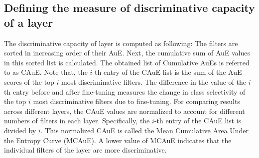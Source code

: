 \subsection{Defining the measure of discriminative capacity of a layer}
The discriminative capacity of layer is computed as following: The filters are sorted in increasing order of their AuE.
Next, the cumulative sum of AuE values in this sorted list is calculated. The obtained list of Cumulative AuEs is referred to as CAuE. 
Note that, the $i$-th entry of the CAuE list is the sum of the AuE scores of the top $i$ most discriminative filters.
The difference in the value of the $i$-th entry before and after fine-tuning measures the change in class selectivity of the top $i$ most discriminative filters due to fine-tuning.
For comparing results across different layers, the CAuE values are normalized to account for different numbers of filters in each layer. 
Specifically, the $i$-th entry of the CAuE list is divided by $i$. 
This normalized CAuE is called the Mean Cumulative Area Under the Entropy Curve (MCAuE).
A lower value of MCAuE indicates that the individual filters of the layer are more discriminative.

